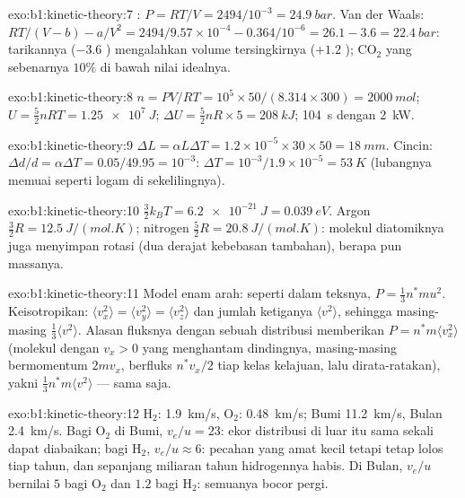 \begin{solution}{exo:b1:kinetic-theory:7}
: $P = RT/V = 2494/10^{-3} = \qty{24.9}{bar}$. Van der Waals:
$RT/(V - b) - a/V^2 = 2494/9.57\times10^{-4} - 0.364/10^{-6} = 26.1 - 3.6 =
\qty{22.4}{bar}$: tarikannya ($-3.6$ ) mengalahkan volume
tersingkirnya ($+1.2$ ); CO$_2$ yang sebenarnya $10\%$ di bawah nilai idealnya.
\end{solution}

\begin{solution}{exo:b1:kinetic-theory:8}
$n = PV/RT = 10^5 \times 50/(8.314 \times 300) = \qty{2000}{mol}$; $U = \tfrac52
nRT = \qty{1.25e7}{J}$; $\Delta U = \tfrac52 nR \times 5 = \qty{208}{kJ}$;
\qty{104}{s} dengan \qty{2}{kW}.
\end{solution}

\begin{solution}{exo:b1:kinetic-theory:9}
$\Delta L = \alpha L\Delta T = 1.2\times10^{-5} \times 30 \times 50 = \qty{18}{mm}$.
Cincin: $\Delta d/d = \alpha\Delta T = 0.05/49.95 = 10^{-3}$: $\Delta T = 10^{-3}/
1.9\times10^{-5} = \qty{53}{K}$ (lubangnya memuai seperti logam di sekelilingnya).
\end{solution}

\begin{solution}{exo:b1:kinetic-theory:10}
$\tfrac32 k_BT = \qty{6.2e-21}{J} = \qty{0.039}{eV}$. Argon $\tfrac32 R =
\qty{12.5}{J/(mol.K)}$; nitrogen $\tfrac52 R = \qty{20.8}{J/(mol.K)}$:
molekul diatomiknya juga menyimpan  rotasi (dua derajat
kebebasan tambahan), berapa pun massanya.
\end{solution}

\begin{solution}{exo:b1:kinetic-theory:11}
Model enam arah: seperti dalam teksnya, $P = \tfrac13 n^*mu^2$. Keisotropikan:
$\langle v_x^2\rangle = \langle v_y^2\rangle = \langle v_z^2\rangle$ dan jumlah
ketiganya $\langle v^2\rangle$, sehingga masing-masing $\tfrac13\langle v^2\rangle$. Alasan
fluksnya dengan sebuah distribusi memberikan $P = n^*m\langle v_x^2\rangle$ (molekul
dengan $v_x > 0$ yang menghantam dindingnya, masing-masing bermomentum $2mv_x$, berfluks $n^*v_x/2$ tiap
kelas kelajuan, lalu dirata-ratakan), yakni $\tfrac13 n^*m\langle v^2\rangle$ --- sama saja.
\end{solution}

\begin{solution}{exo:b1:kinetic-theory:12}
H$_2$: \qty{1.9}{km/s}, O$_2$: \qty{0.48}{km/s}; Bumi \qty{11.2}{km/s}, Bulan
\qty{2.4}{km/s}. Bagi O$_2$ di Bumi, $v_e/u = 23$: ekor
distribusi di luar itu sama sekali dapat diabaikan; bagi H$_2$, $v_e/u \approx 6$:
pecahan yang amat kecil tetapi tetap lolos tiap tahun, dan sepanjang miliaran
tahun hidrogennya habis. Di Bulan, $v_e/u$ bernilai $5$ bagi O$_2$ dan
$1.2$ bagi H$_2$: semuanya bocor pergi.
\end{solution}

